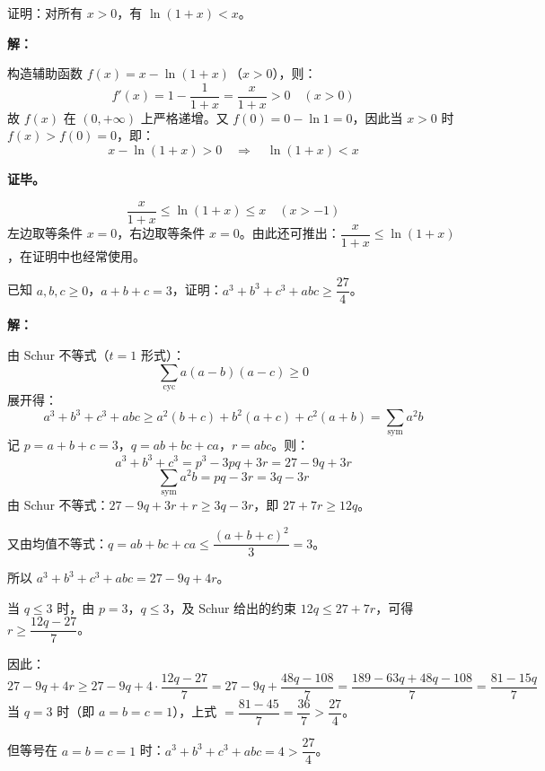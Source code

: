 \documentclass[12pt, a4paper]{ctexart}
\begin{document}
\begin{examplebox}
证明：对所有 $x > 0$，有 $\ln(1+x) < x$。
\end{examplebox}

\textbf{解：}

构造辅助函数 $f(x) = x - \ln(1+x)$（$x > 0$），则：
\[
f'(x) = 1 - \frac{1}{1+x} = \frac{x}{1+x} > 0 \quad (x>0)
\]
故 $f(x)$ 在 $(0,+\infty)$ 上严格递增。又 $f(0) = 0 - \ln 1 = 0$，因此当 $x > 0$ 时 $f(x) > f(0) = 0$，即：
\[
x - \ln(1+x) > 0 \quad\Longrightarrow\quad \ln(1+x) < x
\]

\textbf{证毕。}

\begin{tipbox}[常用放缩公式链]
\[
\frac{x}{1+x} \leqslant \ln(1+x) \leqslant x \quad (x>-1)
\]
左边取等条件 $x=0$，右边取等条件 $x=0$。由此还可推出：$\dfrac{x}{1+x} \leqslant \ln(1+x)$，在证明中也经常使用。
\end{tipbox}

\begin{examplebox}
已知 $a,b,c \geqslant 0$，$a+b+c=3$，证明：$a^3+b^3+c^3+abc \geqslant \dfrac{27}{4}$。
\end{examplebox}

\textbf{解：}

由 Schur 不等式（$t=1$ 形式）：
\[
\sum_{\text{cyc}} a(a-b)(a-c) \geqslant 0
\]
展开得：
\[
a^3+b^3+c^3+abc \geqslant a^2(b+c)+b^2(a+c)+c^2(a+b) = \sum_{\text{sym}} a^2b
\]
记 $p = a+b+c = 3$，$q = ab+bc+ca$，$r = abc$。则：
\[
a^3+b^3+c^3 = p^3 - 3pq + 3r = 27-9q+3r
\]
\[
\sum_{\text{sym}}a^2b = pq - 3r = 3q-3r
\]
由 Schur 不等式：$27-9q+3r+r \geqslant 3q-3r$，即 $27+7r \geqslant 12q$。

又由均值不等式：$q = ab+bc+ca \leqslant \dfrac{(a+b+c)^2}{3} = 3$。

所以 $a^3+b^3+c^3+abc = 27-9q+4r$。

当 $q \leqslant 3$ 时，由 $p=3$，$q \leqslant 3$，及 Schur 给出的约束 $12q \leqslant 27+7r$，可得 $r \geqslant \dfrac{12q-27}{7}$。

因此：
\[
27-9q+4r \geqslant 27-9q+4\cdot\frac{12q-27}{7} = 27-9q+\frac{48q-108}{7} = \frac{189-63q+48q-108}{7} = \frac{81-15q}{7}
\]
当 $q=3$ 时（即 $a=b=c=1$），上式 $= \dfrac{81-45}{7} = \dfrac{36}{7} > \dfrac{27}{4}$。

但等号在 $a=b=c=1$ 时：$a^3+b^3+c^3+abc = 4 > \dfrac{27}{4}$。
\end{document}
